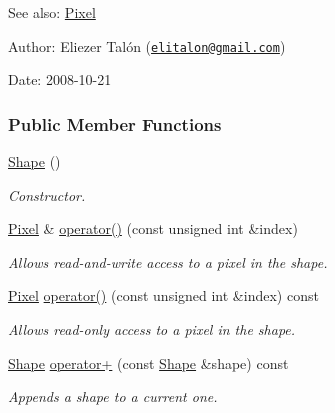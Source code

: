 \begin{Desc}
\item[See also:]\hyperlink{_pixel_8hpp_535e59456e3e633842529cfa8ea103c4}{Pixel}\end{Desc}
\begin{Desc}
\item[Author:]Eliezer Talón (\href{mailto:elitalon@gmail.com}{\tt elitalon@gmail.com}) \end{Desc}
\begin{Desc}
\item[Date:]2008-10-21 \end{Desc}
\subsubsection*{Public Member Functions}
\begin{CompactItemize}
\item 
\hyperlink{class_shape_aa8d87171e65e0d8ba3c5459978992a7}{Shape} ()
\begin{CompactList}\small\item\em Constructor. \item\end{CompactList}\item 
\hyperlink{_pixel_8hpp_535e59456e3e633842529cfa8ea103c4}{Pixel} \& \hyperlink{class_shape_7d12f3a76e2bfb7963c00237eba41e0a}{operator()} (const unsigned int \&index)
\begin{CompactList}\small\item\em Allows read-and-write access to a pixel in the shape. \item\end{CompactList}\item 
\hyperlink{_pixel_8hpp_535e59456e3e633842529cfa8ea103c4}{Pixel} \hyperlink{class_shape_79caae3047826779e0c8094e9882843b}{operator()} (const unsigned int \&index) const 
\begin{CompactList}\small\item\em Allows read-only access to a pixel in the shape. \item\end{CompactList}\item 
\hyperlink{class_shape}{Shape} \hyperlink{class_shape_4e1517d6e14471df4750bc241f517b4e}{operator+} (const \hyperlink{class_shape}{Shape} \&shape) const 
\begin{CompactList}\small\item\em Appends a shape to a current one. \item\end{CompactList}\item 

\end{CompactItemize}
